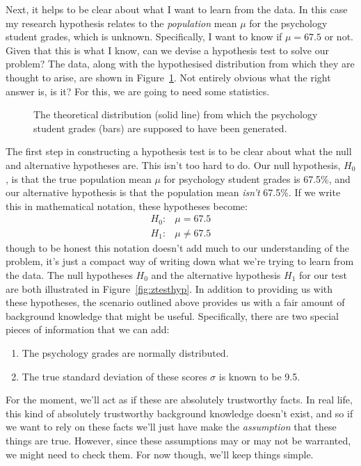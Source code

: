 Next, it helps to be clear about what I want to learn from the data. In this case my research hypothesis relates to the {\it population} mean $\mu$ for the psychology student grades, which is unknown. Specifically, I want to know if $\mu = 67.5$ or not. Given that this is what I know, can we devise a hypothesis test to solve our problem? The data, along with the hypothesised distribution from which they are thought to arise, are shown in Figure~\ref{fig:zeppo}. Not entirely obvious what the right answer is, is it? For this, we are going to need some statistics.

\begin{figure}[htb]
\begin{center}
\caption{The theoretical distribution (solid line) from which the psychology student grades (bars) are supposed to have been generated.}
\HR
\label{fig:zeppo}
\end{center}
\end{figure}


The first step in constructing a hypothesis test is to be clear about what the null and alternative hypotheses are. This isn't too hard to do. Our null hypothesis, $H_0$, is that the true population mean $\mu$ for psychology student grades is 67.5\%, and our alternative hypothesis is that the population mean {\it isn't} 67.5\%. If we write this in mathematical notation, these hypotheses become:
$$
\begin{array}{ll}
H_0: & \mu = 67.5 \\
H_1: & \mu \neq 67.5
\end{array}
$$
though to be honest this notation doesn't add much to our understanding of the problem, it's just a compact way of writing down what we're trying to learn from the data. The null hypotheses $H_0$ and the alternative hypothesis $H_1$ for our test are both illustrated in Figure~\ref{fig:ztesthyp}. In addition to providing us with these hypotheses, the scenario outlined above provides us with a fair amount of background knowledge that might be useful. Specifically, there are two special pieces of information that we can add:
\begin{enumerate} \itemsep -2pt
\item The psychology grades are normally distributed.
\item The true standard deviation of these scores $\sigma$ is known to be 9.5.
\end{enumerate}
For the moment, we'll act as if these are absolutely trustworthy facts. In real life, this kind of absolutely trustworthy background knowledge doesn't exist, and so if we want to rely on these facts we'll just have make the {\it assumption} that these things are true. However, since these assumptions may or may not be warranted, we might need to check them. For now though, we'll keep things simple.


